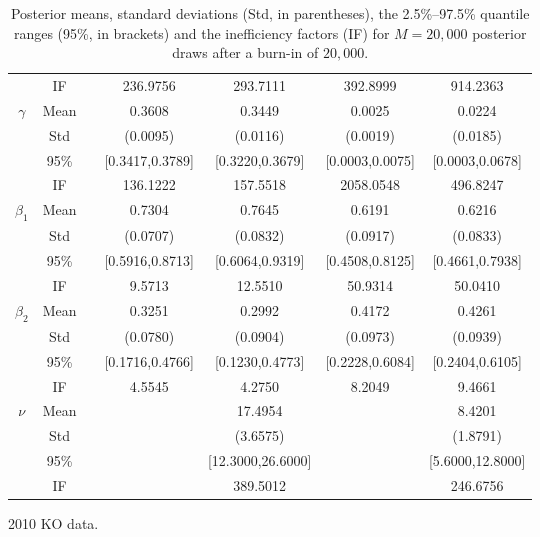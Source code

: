 \begin{table}
\begin{footnotesize}
\begin{singlespace}
{\begin{subtable}{0.8\textwidth}
\begin{tabular}{ccc cccc }
 & IF  &  &  236.9756  &  293.7111  &  392.8999  &  914.2363  \\ [1.0ex] 
 $\gamma$   & Mean   &  &  0.3608  &  0.3449  &  0.0025  &  0.0224  \\  
 & Std   &  &  (0.0095)  &  (0.0116)  &  (0.0019)  &  (0.0185)  \\  
 & 95\%  &  &  [0.3417,0.3789]  &  [0.3220,0.3679]  &  [0.0003,0.0075]  &  [0.0003,0.0678]  \\  
 & IF  &  &  136.1222  &  157.5518  &  2058.0548  &  496.8247  \\ [1.0ex] 
 $\beta_1$   & Mean   &  &  0.7304  &  0.7645  &  0.6191  &  0.6216  \\  
 & Std   &  &  (0.0707)  &  (0.0832)  &  (0.0917)  &  (0.0833)  \\  
 & 95\%  &  &  [0.5916,0.8713]  &  [0.6064,0.9319]  &  [0.4508,0.8125]  &  [0.4661,0.7938]  \\  
 & IF  &  &  9.5713  &  12.5510  &  50.9314  &  50.0410  \\ [1.0ex] 
 $\beta_2$   & Mean   &  &  0.3251  &  0.2992  &  0.4172  &  0.4261  \\  
 & Std   &  &  (0.0780)  &  (0.0904)  &  (0.0973)  &  (0.0939)  \\  
 & 95\%  &  &  [0.1716,0.4766]  &  [0.1230,0.4773]  &  [0.2228,0.6084]  &  [0.2404,0.6105]  \\  
 & IF  &  &  4.5545  &  4.2750  &  8.2049  &  9.4661  \\ [1.0ex] 
 $\nu$   & Mean   &  &     &  17.4954  &    &  8.4201  \\  
 & Std   &  &   &  (3.6575)  &    &  (1.8791)  \\  
 & 95\%  &  &    &  [12.3000,26.6000]  &    &  [5.6000,12.8000]  \\  
 & IF  &  &    &  389.5012  &   &  246.6756  \\ [1.0ex] 
\bottomrule 
\end{tabular}
\caption{2010 KO data.}
\label{tab:sim_res_2010_KO} 
\end{subtable}
}
\end{singlespace}
\end{footnotesize}
 \caption{Posterior means, standard deviations (Std, in parentheses), 
the 2.5\%--97.5\% quantile ranges (95\%, in brackets) and  the inefficiency factors (IF)  for $M=20,000$ posterior draws after a burn-in of $20,000$. }
\end{table}